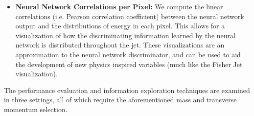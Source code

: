 \begin{itemize}
\item \textbf{Neural Network Correlations per Pixel:}  We compute the linear correlations (i.e. Pearson correlation coefficient) between the neural network output and the distributions of energy in each pixel.  This allows for a visualization of how the discriminating information learned by the neural network is distributed throughout the jet.  These visualizations are an approximation to the neural network discriminator, and can be used to aid the development of new physics inspired variables (much like the Fisher Jet visualization).

\end{itemize}

\noindent The performance evaluation and information exploration techniques are examined in three settings, all of which require the aforementioned mass and transverse momentum selection.
